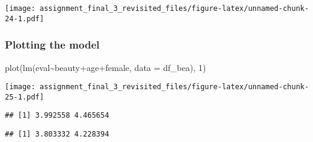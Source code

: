 \documentclass[
]{article}
\newenvironment{Shaded}{\begin{snugshade}}{\end{snugshade}}
\newcommand{\AttributeTok}[1]{\textcolor[rgb]{0.77,0.63,0.00}{#1}}
\newcommand{\DecValTok}[1]{\textcolor[rgb]{0.00,0.00,0.81}{#1}}
\newcommand{\FunctionTok}[1]{\textcolor[rgb]{0.00,0.00,0.00}{#1}}
\newcommand{\NormalTok}[1]{#1}
\newcommand{\SpecialCharTok}[1]{\textcolor[rgb]{0.00,0.00,0.00}{#1}}
\begin{document}
\texttt{[image: assignment\_final\_3\_revisited\_files/figure-latex/unnamed-chunk-24-1.pdf]}

\hypertarget{plotting-the-model}{%
\subsubsection{Plotting the model}\label{plotting-the-model}}

\begin{Shaded}
\begin{Highlighting}[]
\FunctionTok{plot}\NormalTok{(}\FunctionTok{lm}\NormalTok{(eval}\SpecialCharTok{\textasciitilde{}}\NormalTok{beauty}\SpecialCharTok{+}\NormalTok{age}\SpecialCharTok{+}\NormalTok{female, }\AttributeTok{data =}\NormalTok{ df\_bea), }\DecValTok{1}\NormalTok{)}
\end{Highlighting}
\end{Shaded}

\texttt{[image: assignment\_final\_3\_revisited\_files/figure-latex/unnamed-chunk-25-1.pdf]}

\begin{Shaded}
\end{Shaded}

\begin{verbatim}
## [1] 3.992558 4.465654
\end{verbatim}

\begin{Shaded}
\end{Shaded}

\begin{verbatim}
## [1] 3.803332 4.228394
\end{verbatim}

\begin{Shaded}
\end{Shaded}
\end{document}
